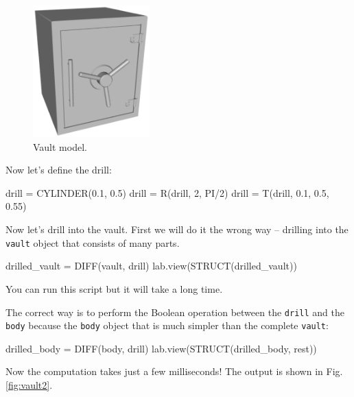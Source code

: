 \begin{figure}[!ht]
\begin{center}
\includegraphics[width=0.4\textwidth]{img/vault.png}
\end{center}
\vspace{-4mm}
\caption{Vault model.}
\label{fig:vault}
\end{figure}
\noindent
Now let's define the drill: 
\begin{bluecode}
drill = CYLINDER(0.1, 0.5)
drill = R(drill, 2, PI/2)
drill = T(drill, 0.1, 0.5, 0.55)
\end{bluecode}
\index{}Now let's drill into the vault. First we will do it 
the wrong way -- drilling into the {\tt vault} object
that consists of many parts. 

\begin{bluecode}
drilled_vault = DIFF(vault, drill)
lab.view(STRUCT(drilled_vault))
\end{bluecode}
You can run this script but it will take a long time.

The correct way is to perform the Boolean 
operation between the {\tt drill} and the {\tt body} 
because the {\tt body} object that is much simpler 
than the complete {\tt vault}: 

\begin{bluecode}
drilled_body = DIFF(body, drill)
lab.view(STRUCT(drilled_body, rest))
\end{bluecode}
Now the computation takes just a few milliseconds!
The output is shown in Fig.\ref{fig:vault2}.

